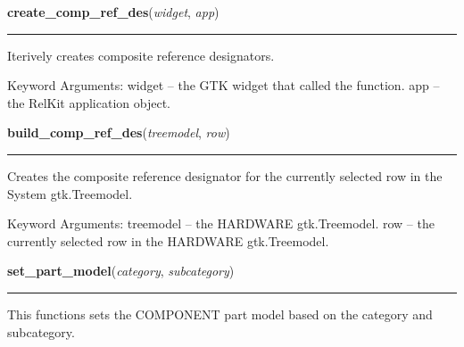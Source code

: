 \hspace{.8\funcindent}\begin{boxedminipage}{\funcwidth}

    \raggedright \textbf{create\_comp\_ref\_des}(\textit{widget}, \textit{app})

    \vspace{-1.5ex}

    \rule{\textwidth}{0.5\fboxrule}
\setlength{\parskip}{2ex}
    Iterively creates composite reference designators.

    Keyword Arguments: widget -- the GTK widget that called the function. 
    app    -- the RelKit application object.

\setlength{\parskip}{1ex}
    \end{boxedminipage}

    \label{reliafree:utilities:build_comp_ref_des}

    \vspace{0.5ex}

\hspace{.8\funcindent}\begin{boxedminipage}{\funcwidth}

    \raggedright \textbf{build\_comp\_ref\_des}(\textit{treemodel}, \textit{row})

    \vspace{-1.5ex}

    \rule{\textwidth}{0.5\fboxrule}
\setlength{\parskip}{2ex}
    Creates the composite reference designator for the currently selected 
    row in the System gtk.Treemodel.

    Keyword Arguments: treemodel -- the HARDWARE gtk.Treemodel. row       
    -- the currently selected row in the HARDWARE gtk.Treemodel.

\setlength{\parskip}{1ex}
    \end{boxedminipage}

    \label{reliafree:utilities:set_part_model}

    \vspace{0.5ex}

\hspace{.8\funcindent}\begin{boxedminipage}{\funcwidth}

    \raggedright \textbf{set\_part\_model}(\textit{category}, \textit{subcategory})

    \vspace{-1.5ex}

    \rule{\textwidth}{0.5\fboxrule}
\setlength{\parskip}{2ex}
    This functions sets the COMPONENT part model based on the category and 
    subcategory.

\setlength{\parskip}{1ex}
    \end{boxedminipage}

